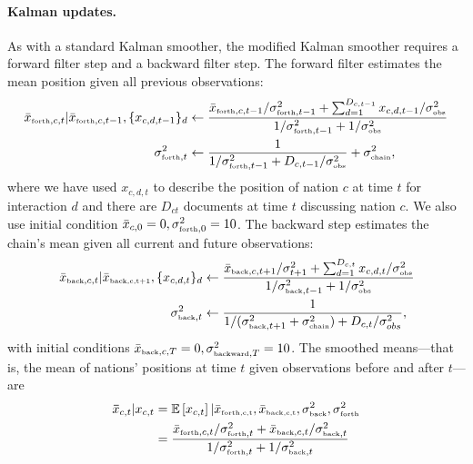 \paragraph{Kalman updates.} As with a standard Kalman smoother, the
modified Kalman smoother requires a forward filter step and a backward
filter step.  The forward filter estimates the mean position given all
previous observations:
\begin{align}
  \bar x_{\mbox{\tiny forth},c,t} | \bar x_{\mbox{\tiny forth},c,t-1},
  \{ x_{c,d,t-1} \}_{d}
  & \gets \frac{\bar x_{\mbox{\tiny forth},c,t-1} / \sigma_{\mbox{\tiny forth},t-1}^2
    + \sum_{d=1}^{D_{c,t-1}} x_{c,d,t-1} / \sigma_{\mbox{\tiny obs}}^2}
  {1 / \sigma_{\mbox{\tiny forth},t-1}^2 + 1 / \sigma_{\mbox{\tiny obs}}^2} \\
  \sigma_{\mbox{\tiny forth},t}^2
  & \gets \frac{1}{1 / \sigma_{\mbox{\tiny forth},t - 1}^2
    + D_{c,t-1} / \sigma_{\mbox{\tiny obs}}^2} + \sigma_{\mbox{\tiny chain}}^2,
\end{align}
where we have used $x_{c,d,t}$ to describe the position of nation $c$
at time $t$ for interaction $d$ and there are $D_{ct}$ documents at
time $t$ discussing nation $c$.  We also use initial condition $\bar
x_{c,0} = 0, \sigma_{\mbox{\tiny forth},0}^2=10$.  The backward step
estimates the chain's mean given all current and future observations:
\begin{align}
  \bar x_{\mbox{\tiny back},c,t} | \bar x_{\mbox{\tiny back,c,t+1}}, \{ x_{c,d,t} \}_d
  & \gets \frac{\bar x_{\mbox{\tiny back},c,t+1} / \sigma_{t+1}^2
    + \sum_{d=1}^{D_{c,t}} x_{c,d,t} / \sigma_{\mbox{\tiny obs}}^2}
  {1 / \sigma_{\mbox{\tiny back},t-1}^2 + 1 / \sigma_{\mbox{\tiny obs}}^2} \nonumber \\
  \sigma_{\mbox{\tiny back},t}^2
  & \gets \frac{1}{1 / (\sigma_{\mbox{\tiny back},t + 1}^2 + \sigma_{\mbox{\tiny chain}}^2)
    + D_{c,t} / \sigma_{\tiny obs}^2},
\end{align}
with initial conditions $\bar x_{\mbox{\tiny back},c,T} = 0,
\sigma_{\mbox{\tiny backward},T}^2=10$. The smoothed means---that is,
the mean of nations' positions at time $t$ given observations before
and after $t$---are
\begin{align}
  \bm \bar x_{c,t} | x_{c,t} & = \mathbb{E}\left[ x_{c,t}\right] | \bar x_{\mbox{\tiny forth,c,t}}, \bar x_{\mbox{\tiny back,c,t}}, \sigma_{\mbox{\tiny back}}^2, \sigma_{\mbox{\tiny forth}}^2 \nonumber \\
  & = \frac{\bar x_{\mbox{\tiny forth},c,t} / \sigma_{\mbox{\tiny forth},t}^2
    + \bar x_{\mbox{\tiny back},c,t} / \sigma_{\mbox{\tiny back},t}^2}
  {1 / \sigma_{\mbox{\tiny forth},t}^2
    + 1 / \sigma_{\mbox{\tiny back},t}^2}
\end{align}

